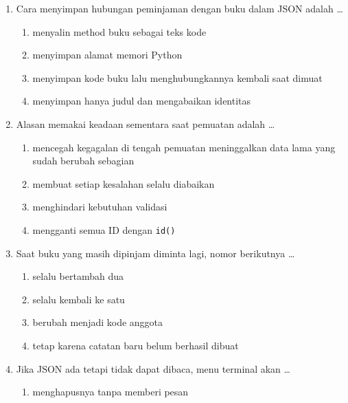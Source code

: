 \begin{enumerate}
  \begin{enumerate}[label=\alph*.,itemsep=0pt]
    \item menghapus semua buku pada layanan
    \item mengosongkan list hasil tanpa menghapus dictionary layanan
    \item menghapus file JSON secara otomatis
    \item mengubah semua kode buku
  \end{enumerate}
  \item Cara menyimpan hubungan peminjaman dengan buku dalam JSON adalah \ldots
  \begin{enumerate}[label=\alph*.,itemsep=0pt]
    \item menyalin method buku sebagai teks kode
    \item menyimpan alamat memori Python
    \item menyimpan kode buku lalu menghubungkannya kembali saat dimuat
    \item menyimpan hanya judul dan mengabaikan identitas
  \end{enumerate}
  \item Alasan memakai keadaan sementara saat pemuatan adalah \ldots
  \begin{enumerate}[label=\alph*.,itemsep=0pt]
    \item mencegah kegagalan di tengah pemuatan meninggalkan data lama yang sudah berubah sebagian
    \item membuat setiap kesalahan selalu diabaikan
    \item menghindari kebutuhan validasi
    \item mengganti semua ID dengan \texttt{id()}
  \end{enumerate}
  \item Saat buku yang masih dipinjam diminta lagi, nomor berikutnya \ldots
  \begin{enumerate}[label=\alph*.,itemsep=0pt]
    \item selalu bertambah dua
    \item selalu kembali ke satu
    \item berubah menjadi kode anggota
    \item tetap karena catatan baru belum berhasil dibuat
  \end{enumerate}
  \item Jika JSON ada tetapi tidak dapat dibaca, menu terminal akan \ldots
  \begin{enumerate}[label=\alph*.,itemsep=0pt]
    \item menghapusnya tanpa memberi pesan

\end{enumerate}
\end{enumerate}

